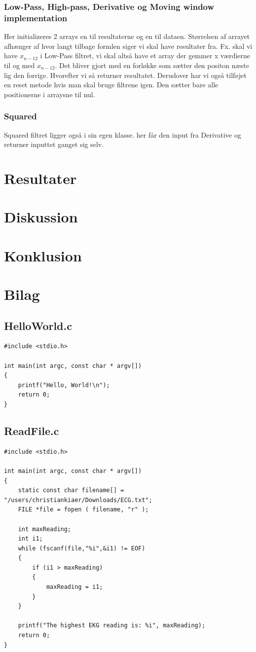 \documentclass[a4paper,12pt]{article}
\begin{document}
\subsubsection{Low-Pass, High-pass, Derivative og Moving window implementation}
Her initializeres 2 arrays en til resultaterne og en til dataen. Størrelsen af arrayet afhænger af hvor langt tilbage formlen siger vi skal have resultater fra. Fx. skal vi have $x_{n-12}$ i Low-Pass filtret, vi skal altså have et array der gemmer x værdierne til og med $x_{n-12}$. Det bliver gjort med en forløkke som sætter den positon næste lig den forrige.
Hvorefter vi så returner resultatet. Derudover har vi også tilføjet en reset metode hvis man skal bruge filtrene igen. Den sætter bare alle positionerne i arraysne til nul.

\subsubsection{Squared}
Squared filtret ligger også i sin egen klasse. her får den input fra Derivative og returner inputtet ganget sig selv.

\section{Resultater}

\section{Diskussion}

\section{Konklusion}
\newpage
\section{Bilag}
\subsection{HelloWorld.c}
\begin{verbatim}
#include <stdio.h>

int main(int argc, const char * argv[])
{
    printf("Hello, World!\n");
    return 0;
}
\end{verbatim}
\subsection{ReadFile.c}
\begin{verbatim}
#include <stdio.h>

int main(int argc, const char * argv[])
{
    static const char filename[] = "/users/christiankiaer/Downloads/ECG.txt";
    FILE *file = fopen ( filename, "r" );
    
    int maxReading;
    int i1;
    while (fscanf(file,"%i",&i1) != EOF)
    {
        if (i1 > maxReading)
        {
            maxReading = i1;
        }
    }
    
    printf("The highest EKG reading is: %i", maxReading);
    return 0;
}
\end{verbatim}
\end{document}

